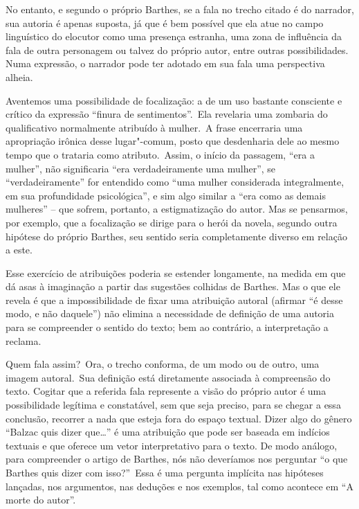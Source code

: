 No entanto, e segundo o próprio Barthes, se a fala no trecho citado é do
narrador, sua autoria é apenas suposta, já que é bem possível que ela
atue no campo linguístico do elocutor como uma presença estranha, uma
zona de influência da fala de outra personagem ou talvez do próprio
autor, entre outras possibilidades. Numa expressão, o narrador pode ter
adotado em sua fala uma perspectiva alheia.

Aventemos uma possibilidade de focalização: a de um uso bastante
consciente e crítico da expressão ``finura de sentimentos''.~Ela
revelaria uma zombaria do qualificativo normalmente atribuído à mulher.~A frase encerraria uma apropriação irônica desse lugar"-comum, posto que desdenharia dele ao mesmo tempo que o trataria como atributo.~Assim,
o início da passagem, ``era a mulher'', não significaria ``era
verdadeiramente uma mulher'', se ``verdadeiramente'' for entendido como
``uma mulher considerada integralmente, em sua profundidade
psicológica'', e sim algo similar a ``era como as demais mulheres'' --
que sofrem, portanto, a estigmatização do autor. Mas se pensarmos, por
exemplo, que a focalização se dirige para o herói da novela, segundo
outra hipótese do próprio Barthes, seu sentido seria completamente
diverso em relação a este.

Esse exercício de atribuições poderia se estender longamente, na medida
em que dá asas à imaginação a partir das sugestões colhidas de Barthes.
Mas o que ele revela é que a impossibilidade de fixar uma atribuição
autoral (afirmar ``é desse modo, e não daquele'') não elimina a
necessidade de definição de uma autoria para se compreender o sentido do
texto; bem ao contrário, a interpretação a reclama.

Quem fala assim?~Ora, o trecho conforma, de um modo ou de outro, uma
imagem autoral.~Sua definição está diretamente associada à compreensão
do texto. Cogitar que a referida fala represente a visão do próprio
autor é uma possibilidade legítima e constatável, sem que seja preciso,
para se chegar a essa conclusão, recorrer a nada que esteja fora do
espaço textual. Dizer algo do gênero ``Balzac quis dizer que\ldots{}'' é uma
atribuição que pode ser baseada em indícios textuais e que oferece um
vetor interpretativo para o texto. De modo análogo, para compreender o
artigo de Barthes, nós não deveríamos nos perguntar ``o que Barthes quis
dizer com isso?''~Essa é uma pergunta implícita nas hipóteses lançadas,
nos argumentos, nas deduções e nos exemplos, tal como acontece em ``A
morte do autor''.


